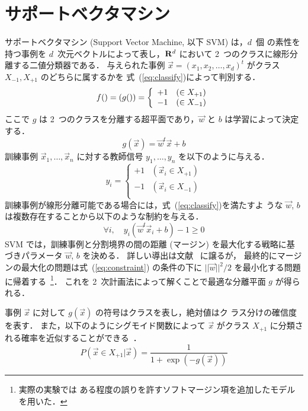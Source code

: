 \section{サポートベクタマシン}
\label{sec:svm}

サポートベクタマシン
(Support Vector Machine, 以下 SVM) \cite{vapnik_book_99} は，$d$~個
の素性を持つ事例を $d$~次元ベクトルによって表し，${\bf R}^d$ において
2~つのクラスに線形分離する二値分類器である．
与えられた事例 $\vec{x}=(x_1,x_2,\ldots,x_d)^t$ がクラス
$X_{-1}, X_{+1}$ のどちらに属するかを
式~(\ref{eq:classify})によって判別する．
\begin{equation}
  \label{eq:classify}
  f(\vec{x}) = \sign(g(\vec{x})) = \left\{
    \begin{array}{rl}
      +1 & \left( \vec{x} \in X_{+1} \right)\\
      -1 & \left( \vec{x} \in X_{-1} \right)\\
    \end{array}
  \right.
\end{equation}
ここで $g$ は 2~つのクラスを分離する超平面であり，$\vec{w}$
と $b$ は学習によって決定する．
\begin{equation}
  \label{eq:hyperplain}
  g(\vec{x}) = \vec{w}^t \vec{x} + b
\end{equation}
訓練事例 $\vec{x}_1,\ldots,\vec{x}_n$ に対する教師信号
$y_1,\ldots,y_n$ を以下のように与える．
\[ y_i = \left\{
  \begin{array}{rl}
    +1 & \left( \vec{x}_i \in X_{+1} \right) \\
    -1 & \left( \vec{x}_i \in X_{-1} \right) \\
  \end{array}
  \right.
\]
訓練事例が線形分離可能である場合には，式~(\ref{eq:classify})を満たすよ
うな $\vec{w}$, $b$ は複数存在することから以下のような制約を与える．
\begin{equation}
  \label{eq:constraint}
  \forall i, \quad y_i (\vec{w}^t \vec{x}_i + b) - 1 \geq 0
\end{equation}
SVM では，訓練事例と分割境界の間の距離 (マージン) を最大化する戦略に基
づきパラメータ $\vec{w}$, $b$ を決める．
詳しい導出は文献~\cite{vapnik_book_99} に譲るが，
最終的にマージンの最大化の問題は式~(\ref{eq:constraint}) の条件の下に
$||\vec{w}||^2/2$ を最小化する問題に帰着する~\footnote{実際の実験では
  ある程度の誤りを許すソフトマージン項を追加したモデルを用いた．}．
これを 2~次計画法によって解くことで最適な分離平面 $g$ が得られる．

事例 $\vec{x}$ に対して $g(\vec{x})$ の符号はクラスを表し，絶対値はク
ラス分けの確信度を表す．
また，以下のようにシグモイド関数によって $\vec{x}$ がクラス $X_{+1}$
に分類される確率を近似することができる~\cite{platt_99}．
\begin{equation}
  \label{eq:sigmoid}
  P(\vec{x} \in X_{+1}|\vec{x}) = \frac{1}{1+\exp(-g(\vec{x}))}
\end{equation}


